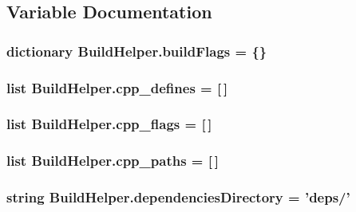 \subsection{Variable Documentation}
\hypertarget{namespaceBuildHelper_ae6e73da20b07d908ae39169423080658}{
\subsubsection[{build\-Flags}]{\setlength{\rightskip}{0pt plus 5cm}dictionary Build\-Helper.\-build\-Flags = \{\}}}\label{namespaceBuildHelper_ae6e73da20b07d908ae39169423080658}
\hypertarget{namespaceBuildHelper_a82ebf50fb6a2bf83f595dc90654de642}{
\subsubsection[{cpp\-\_\-defines}]{\setlength{\rightskip}{0pt plus 5cm}list Build\-Helper.\-cpp\-\_\-defines = \mbox{[}$\,$\mbox{]}}}\label{namespaceBuildHelper_a82ebf50fb6a2bf83f595dc90654de642}
\hypertarget{namespaceBuildHelper_a5f67ef24924ddcacd1cb393c5f3a12e3}{
\subsubsection[{cpp\-\_\-flags}]{\setlength{\rightskip}{0pt plus 5cm}list Build\-Helper.\-cpp\-\_\-flags = \mbox{[}$\,$\mbox{]}}}\label{namespaceBuildHelper_a5f67ef24924ddcacd1cb393c5f3a12e3}
\hypertarget{namespaceBuildHelper_a3ef319545a26f3d8f094acc8d1623bc3}{
\subsubsection[{cpp\-\_\-paths}]{\setlength{\rightskip}{0pt plus 5cm}list Build\-Helper.\-cpp\-\_\-paths = \mbox{[}$\,$\mbox{]}}}\label{namespaceBuildHelper_a3ef319545a26f3d8f094acc8d1623bc3}
\hypertarget{namespaceBuildHelper_a6468554b04e6e16120b748e91b214ffc}{
\subsubsection[{dependencies\-Directory}]{\setlength{\rightskip}{0pt plus 5cm}string Build\-Helper.\-dependencies\-Directory = 'deps/'}}\label{namespaceBuildHelper_a6468554b04e6e16120b748e91b214ffc}

